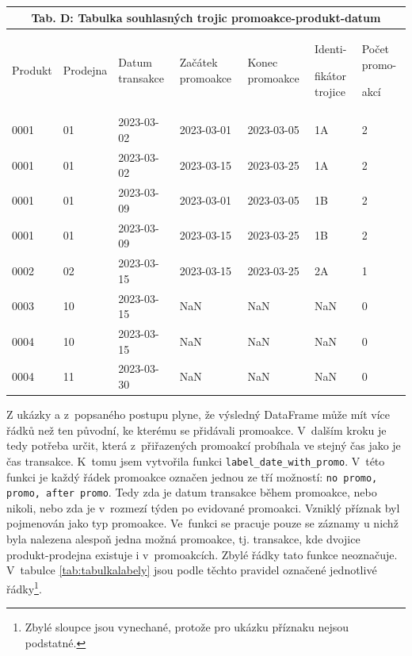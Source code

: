 \begin{table}[hbtp!]
\begin{tabular}{llp{2cm}p{2.2cm}p{2cm}p{2cm}}
    \end{tabular}
\bigskip
    \begin{tabular}{llp{2cm}p{2cm}p{2.1cm}p{1.2cm}p{1.3cm}}
        \multicolumn{7}{c}{Tab. D: Tabulka souhlasných trojic promoakce-produkt-datum} \\
        \toprule
        Produkt & Prodejna & Datum transakce & Začátek promoakce & Konec \newline promoakce& Identi-\par fikátor trojice & Počet \newline promo-\par akcí\\
        \midrule
        0001 & 01 & 2023-03-02 & 2023-03-01 & 2023-03-05 & 1A & 2 \\
        0001 & 01 & 2023-03-02 & 2023-03-15 & 2023-03-25 & 1A & 2 \\
        0001 & 01 & 2023-03-09 & 2023-03-01 & 2023-03-05 & 1B & 2 \\
        0001 & 01 & 2023-03-09 & 2023-03-15 & 2023-03-25 & 1B & 2 \\
        0002 & 02 & 2023-03-15 & 2023-03-15 & 2023-03-25 & 2A & 1 \\
        0003 & 10 & 2023-03-15 & NaN & NaN & NaN & 0 \\
        0004 & 10 & 2023-03-15 & NaN & NaN & NaN & 0 \\
        0004 & 11 & 2023-03-30 & NaN& NaN & NaN & 0 \\
        \bottomrule
    \end{tabular}
    \label{tab:tabulkypromoakceukaz}
\end{table}

Z ukázky a z~popsaného postupu plyne, že výsledný DataFrame může mít více řádků než ten původní, ke kterému se přidávali promoakce. V~dalším kroku je tedy potřeba určit, která z~přiřazených promoakcí probíhala ve stejný čas jako je čas transakce. K~tomu jsem vytvořila funkci \texttt{label\_date\_with\_promo}. V~této funkci je každý řádek promoakce označen jednou ze tří možností: \texttt{no promo, promo, after promo}. Tedy zda je datum transakce během promoakce, nebo nikoli, nebo zda je v~rozmezí týden po evidované promoakci. Vzniklý příznak byl pojmenován jako typ promoakce. Ve~funkci se pracuje pouze se záznamy u nichž byla nalezena alespoň jedna možná promoakce, tj. transakce, kde dvojice produkt-prodejna existuje i v~promoakcích. Zbylé řádky tato funkce neoznačuje. V~tabulce \ref*{tab:tabulkalabely} jsou podle těchto pravidel označené jednotlivé řádky\footnote[1]{Zbylé sloupce jsou vynechané, protože pro ukázku příznaku nejsou podstatné.}.
 
